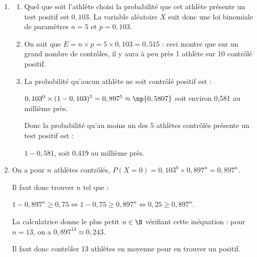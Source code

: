 \medskip



\medskip

\begin{enumerate}
\item 


	\begin{enumerate}
		\item 
		Quel que soit l'athlète choisi la probabilité que cet  athlète présente un test positif est $0,103$. La variable aléatoire $X$ suit donc une loi binomiale de paramètres $n = 5$ et $p = 0,103$.
		\item 
On sait que $E = n \times p = 5 \times 0,103 = 0,515$ : ceci montre que sur un grand nombre de contrôles, il y aura à peu près 1 athlète sur 10 contrôlé positif.
		\item 
La probabilité qu'aucun athlète ne soit contrôlé positif est :

$0,103^0 \times (1 - 0,103)^5 = 0,897^5 \approx \np{0,5807}$ soit environ 0,581 au millième près.

Donc la probabilité qu'au moins un des 5 athlètes contrôlés présente un test positif est :

$1 - 0,581$, soit 0,419 au millième près.
	\end{enumerate}
\item 
On a pour $n$ athlètes contrôlés, $P(X = 0) = 0,103^0 \times 0,897^n = 0,897^n$.

Il faut donc trouver $n$ tel que :

$1 - 0,897^n \geqslant 0,75 \iff 1 - 0,75 \geqslant 0,897^n \iff 0,25 \geqslant 0,897^n$.

La calculatrice donne le plus petit $n \in \N$ vérifiant cette inéquation : pour $n = 13$, on a $0,897^{13} \approx 0,243$.

Il faut donc contrôler 13 athlètes en moyenne pour en trouver un positif.
\end{enumerate}
\vspace{0,5cm}
\bigskip
